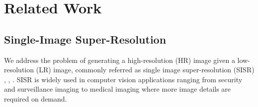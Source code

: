 \documentclass[10pt,twocolumn,letterpaper]{article}
\begin{document}
%
%
%
%


\section{Related Work}
\subsection{Single-Image Super-Resolution}

We address the problem of generating a high-resolution (HR) image given a low-resolution (LR) image, commonly referred as single image super-resolution (SISR) \cite{Irani1991}, \cite{freeman2000learning}, \cite{glasner2009super}. SISR is widely used in computer vision applications ranging from security and surveillance imaging to medical imaging where more image details are required on demand.
\end{document}
